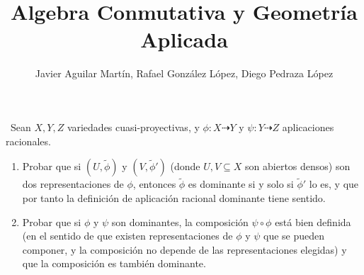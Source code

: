 \documentclass[twoside]{article}
\begin{document}
\title{Algebra Conmutativa y Geometría Aplicada}
\author{Javier Aguilar Martín, Rafael González López, Diego Pedraza López}
\maketitle

\begin{ejercicio}{1}\
Sean $X, Y,Z$ variedades cuasi-proyectivas, y $\phi : X \dashrightarrow Y$ y $\psi : Y \dashrightarrow Z$ aplicaciones racionales.
\begin{enumerate}
\item Probar que si $(U, \tilde{\phi})$ y $(V, \tilde{\phi}')$ (donde $U, V \subseteq X$ son abiertos densos) son
dos representaciones de $\phi$, entonces $\tilde{\phi}$ es dominante si y solo si $\tilde{\phi}'$ lo es, y
que por tanto la definición de aplicación racional dominante tiene sentido.
\item Probar que si $\phi$ y $\psi$ son dominantes, la composición  $\psi\circ\phi$ está bien definida
(en el sentido de que existen representaciones de $\phi$ y $\psi$ que se pueden
componer, y la composición no depende de las representaciones elegidas)
y que la composición es también dominante.
\end{enumerate}
\end{ejercicio}
\end{document}
